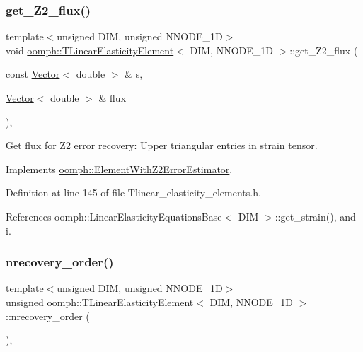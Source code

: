 \subsubsection{\texorpdfstring{get\+\_\+\+Z2\+\_\+flux()}{get\_Z2\_flux()}}
{\footnotesize\ttfamily template$<$unsigned D\+IM, unsigned N\+N\+O\+D\+E\+\_\+1D$>$ \\
void \hyperlink{classoomph_1_1TLinearElasticityElement}{oomph\+::\+T\+Linear\+Elasticity\+Element}$<$ D\+IM, N\+N\+O\+D\+E\+\_\+1D $>$\+::get\+\_\+\+Z2\+\_\+flux (\begin{DoxyParamCaption}\item[{const \hyperlink{classoomph_1_1Vector}{Vector}$<$ double $>$ \&}]{s,  }\item[{\hyperlink{classoomph_1_1Vector}{Vector}$<$ double $>$ \&}]{flux }\end{DoxyParamCaption})\hspace{0.3cm}{\ttfamily [inline]}, {\ttfamily [virtual]}}



Get \textquotesingle{}flux\textquotesingle{} for Z2 error recovery\+: Upper triangular entries in strain tensor. 



Implements \hyperlink{classoomph_1_1ElementWithZ2ErrorEstimator_a5688ff5f546d81771cabad82ca5a7556}{oomph\+::\+Element\+With\+Z2\+Error\+Estimator}.



Definition at line 145 of file Tlinear\+\_\+elasticity\+\_\+elements.\+h.



References oomph\+::\+Linear\+Elasticity\+Equations\+Base$<$ D\+I\+M $>$\+::get\+\_\+strain(), and i.

\mbox{\label{classoomph_1_1TLinearElasticityElement_a4e896fd9ef9e6d2efcefbb2b162925ff}} 
\subsubsection{\texorpdfstring{nrecovery\+\_\+order()}{nrecovery\_order()}}
{\footnotesize\ttfamily template$<$unsigned D\+IM, unsigned N\+N\+O\+D\+E\+\_\+1D$>$ \\
unsigned \hyperlink{classoomph_1_1TLinearElasticityElement}{oomph\+::\+T\+Linear\+Elasticity\+Element}$<$ D\+IM, N\+N\+O\+D\+E\+\_\+1D $>$\+::nrecovery\+\_\+order (\begin{DoxyParamCaption}{ }\end{DoxyParamCaption})\hspace{0.3cm}{\ttfamily [inline]}, {\ttfamily [virtual]}}



